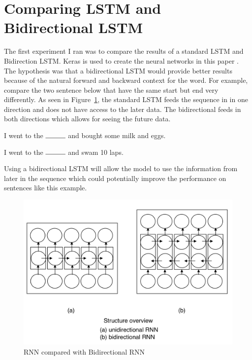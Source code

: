 \documentclass[11pt,a4paper]{article}
\begin{document}
\section{Comparing LSTM and Bidirectional LSTM}
The first experiment I ran was to compare the results of a standard LSTM and Bidirection LSTM.
Keras is used to create the neural networks in this paper \cite{keras}.
The hypothesis was that a bidirectional LSTM would provide better results because of the natural forward and backward context for the word.
For example, compare the two sentence below that have the same start but end very differently.
As seen in Figure~\ref{fig:rnn_brnn}, the standard LSTM feeds the sequence in in one direction and does not have access to the later data. The bidirectional feeds in both directions which allows for seeing the future data.

\begin{displayquote}
I went to the $\rule{1cm}{0.15mm}$ and bought some milk and eggs.
\end{displayquote}

\begin{displayquote}
I went to the $\rule{1cm}{0.15mm}$ and swam 10 laps.
\end{displayquote}

Using a bidirectional LSTM will allow the model to use the information from later in the sequence which could potentially improve the performance on sentences like this example. \cite{ngcoursera}

\begin{figure}[h!]
\centering
\includegraphics[scale=0.4]{RNN_BRNN.png}
\caption{RNN compared with Bidirectional RNN \cite{brnn}}
\label{fig:rnn_brnn}
\end{figure}
\end{document}
